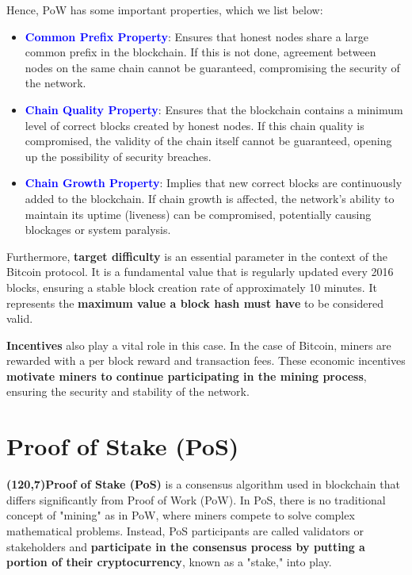 Hence, PoW has some important properties, which we list below:
\begin{itemize}
    \item \textbf{\textcolor{Blue}{Common Prefix Property}}: Ensures that honest nodes share a large common prefix in the blockchain. If this is not done, agreement between nodes on the same chain cannot be guaranteed, compromising the security of the network.
    \item \textbf{\textcolor{Blue}{Chain Quality Property}}: Ensures that the blockchain contains a minimum level of correct blocks created by honest nodes. If this chain quality is compromised, the validity of the chain itself cannot be guaranteed, opening up the possibility of security breaches.
    \item \textbf{\textcolor{Blue}{Chain Growth Property}}: Implies that new correct blocks are continuously added to the blockchain. If chain growth is affected, the network's ability to maintain its uptime (liveness) can be compromised, potentially causing blockages or system paralysis.
\end{itemize}
    
Furthermore, \textbf{target difficulty} is an essential parameter in the context of the Bitcoin protocol. It is a fundamental value that is regularly updated every 2016 blocks, ensuring a stable block creation rate of approximately 10 minutes. It represents the \textbf{maximum value a block hash must have} to be considered valid.

\textbf{Incentives} also play a vital role in this case. In the case of Bitcoin, miners are rewarded with a per block reward and transaction fees. These economic incentives \textbf{motivate miners to continue participating in the mining process}, ensuring the security and stability of the network.

\section{Proof of Stake (PoS)}
\colorbox{Orange!70}{\textbf{\makebox(120,7){Proof of Stake (PoS)}}} is a consensus algorithm used in blockchain that differs significantly from Proof of Work (PoW). In PoS, there is no traditional concept of "mining" as in PoW, where miners compete to solve complex mathematical problems. Instead, PoS participants are called validators or stakeholders and \textbf{participate in the consensus process by putting a portion of their cryptocurrency}, known as a "stake," into play.

